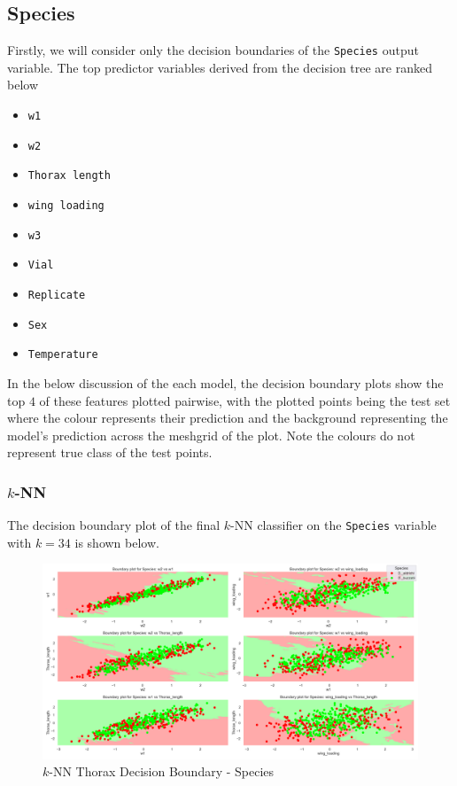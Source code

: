 \documentclass{article}
\begin{document}
\subsection{Species}

Firstly, we will consider only the decision boundaries of the \texttt{Species} output variable. The top predictor variables derived from the decision tree are ranked below


\begin{itemize}
    \item \texttt{w1}
    \item \texttt{w2}
    \item \texttt{Thorax length}
    \item \texttt{wing loading}
    \item \texttt{w3}
    \item \texttt{Vial}
    \item \texttt{Replicate}
    \item \texttt{Sex}
    \item \texttt{Temperature}
\end{itemize}


In the below discussion of the each model, the decision boundary plots show the top $4$ of these features plotted pairwise, with the plotted points being the test set where the colour represents their prediction and the background representing the model's prediction across the meshgrid of the plot. Note the colours do not represent true class of the test points.

\newpage
\subsubsection{$k$-NN}

The decision boundary plot of the final $k$-NN classifier on the \texttt{Species} variable with $k = 34$ is shown below.

\begin{figure}[htb]
    \centering
    \includegraphics[width=0.8\columnwidth]{plots/knn_Thorax_decision_boundaries_Species.png}
    \caption{$k$-NN Thorax Decision Boundary - Species}
    \label{fig:knnt_thorax_db_species}
\end{figure}
\end{document}
